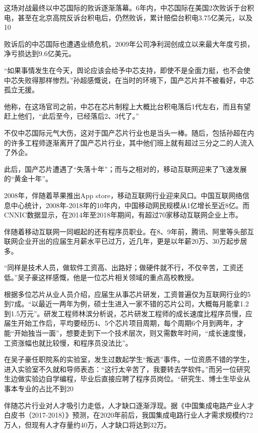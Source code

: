 \documentclass[utf8]{book}
\begin{document}
	这场对战最终以中芯国际的败诉逐渐落幕。6年内，中芯国际在美国2次败诉于台积电，甚至在北京高院反诉台积电后，仍然败诉，累计赔偿台积电3.75亿美元，以及10%
	
	败诉后的中芯国际也遭遇业绩危机，2009年公司净利润创成立以来最大年度亏损，净亏损达到9.6亿美元。
	
	“如果事情发生在今天，舆论应该会给予中芯支持，即使不是全面力挺，也不会使中芯失败得那样惨烈。”孙超感慨说，在当时的环境下，国产芯片并不被看好，中芯孤立无援。
	
	他称，在这场官司之前，中芯在芯片制程上大概比台积电落后1代左右，而且有望赶上他们，“此后至今，已经落后2、3代了。”
	
	不仅中芯国际元气大伤，这对于国产芯片行业也是当头一棒。随后，包括孙超在内的许多工程师逐渐离开了国产芯片行业，其中他们班上就有超过三分之二的人流入了外企。
	
	此后，国产芯片遭遇了“失落十年”；而与之相对的，移动互联网迎来了飞速发展的“黄金十年”。
	
	2008年，伴随着苹果推出App store，移动互联网行业迎来风口。中国互联网络信息中心统计，2008年-2018年的10年内，中国移动网民规模从1亿增长至近8亿。而CNNIC数据显示，在2014年至2018年期间，有超过70家移动互联网企业上市。
	
	伴随着移动互联网一同崛起的还有程序员职业。在8、9年前，腾讯、阿里等头部互联网企业开出的应届生月薪水平已过万，近几年，更是以年薪20万、30万起步居多。
	
	“同样是技术人员，做软件工资高、出路好；做硬件就不行，不仅辛苦，工资还低。”吴子豪这样感慨，他是一位芯片相关领域的重点高校教授。
	
	根据多位芯片从业人员介绍，应届生从事芯片研发，工资普遍仅为互联网行业的5到7成。“以最近一两年为例，硕士生进入一家不错的芯片公司，大概每月能拿1.2到1.5万元”。研发工程师林滨分析说，芯片研发工程师的成长速度比程序员慢，应届生开始工作后，平均要经历4、5个芯片项目周期，每个周期6个月到两年，才能“开始独当一面”，想要走到下一个技术层次，则又需数年时间，“成长速度慢，工资涨幅也就比较慢，和程序员没法比”。
	
	在吴子豪任职院系的实验室，发生过数起学生“叛逃”事件。一位资质不错的学生，进入实验室不久就和导师表态：“这行太辛苦了，我要转去学软件。”而另一位研究生边做实验边自学编程，毕业后直接应聘了程序员岗位。“研究生、博士生毕业从事本专业的占比不到20%
	
	伴随芯片行业对人才吸引力走低，人才缺口逐渐浮现。据《中国集成电路产业人才白皮书（2017-2018）》预测，在2020年前后，我国集成电路行业人才需求规模约72万人，但现有人才存量约40万，人才缺口将达到32万。
	
\end{document}
